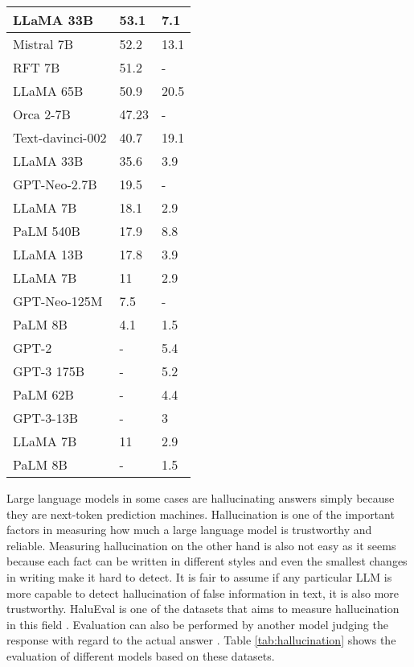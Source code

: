 \documentclass[conference]{IEEEtran}
\begin{document}
\begin{table}[H]
\begin{tabular}{|l|l|l|}
LLaMA 33B & 53.1 & 7.1 \\ \hline
Mistral 7B & 52.2 & 13.1 \\ \hline
RFT 7B & 51.2 & - \\ \hline
LLaMA 65B & 50.9 & 20.5 \\ \hline
Orca 2-7B & 47.23 & - \\ \hline
Text-davinci-002 & 40.7 & 19.1 \\ \hline
LLaMA 33B & 35.6 & 3.9 \\ \hline
GPT-Neo-2.7B & 19.5 & - \\ \hline
LLaMA 7B & 18.1 & 2.9 \\ \hline
PaLM 540B & 17.9 & 8.8 \\ \hline
LLaMA 13B & 17.8 & 3.9 \\ \hline
LLaMA 7B & 11 & 2.9 \\ \hline
GPT-Neo-125M & 7.5 & - \\ \hline
PaLM 8B & 4.1 & 1.5 \\ \hline
GPT-2 & - & 5.4 \\ \hline
GPT-3 175B & - & 5.2 \\ \hline
PaLM 62B & - & 4.4 \\ \hline
GPT-3-13B & - & 3 \\ \hline
LLaMA 7B & 11 & 2.9 \\ \hline
PaLM 8B & - & 1.5 \\ \hline
    \end{tabular}
\end{table}

Large language models in some cases are hallucinating answers simply because they are next-token prediction machines. Hallucination is one of the important factors in measuring how much a large language model is trustworthy and reliable. Measuring hallucination on the other hand is also not easy as it seems because each fact can be written in different styles and even the smallest changes in writing make it hard to detect. It is fair to assume if any particular LLM is more capable to detect hallucination of false information in text, it is also more trustworthy. HaluEval is one of the datasets that aims to measure hallucination in this field \cite{li2023halueval}. Evaluation can also be performed by another model judging the response with regard to the actual answer \cite{Simon2024}. Table \ref{tab:hallucination} shows the evaluation of different models based on these datasets.
\end{document}
